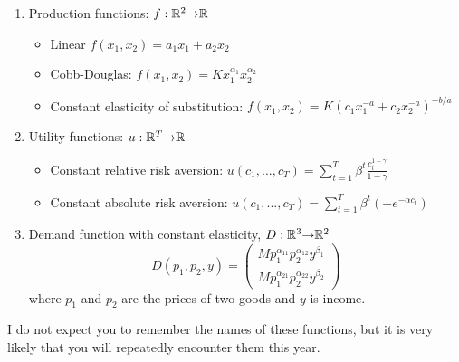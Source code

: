 \begin{example}$\;$
\begin{enumerate}
\item Production functions: $f:\mathbb{R}^2 {\rightarrow} \mathbb{R}$ 
  \begin{itemize}
  \item Linear $ f(x_1,x_2) = a_1 x_1 + a_2 x_2 $
  \item Cobb-Douglas: $f(x_1,x_2) = K x_1^{\alpha_1} x_2^{\alpha_2}$
  \item Constant elasticity of substitution: $f(x_1,x_2) = K (c_1
    x_1^{-a} + c_2 x_2^{-a})^{-b/a}$
  \end{itemize}
\item Utility functions: $u: \mathbb{R}^T {\rightarrow} \mathbb{R}$
  \begin{itemize}
  \item Constant relative risk aversion: $u(c_1,...,c_T) =
    \sum_{t=1}^T \beta^t \frac{c_t^{1-\gamma}}{1-\gamma}$
  \item Constant absolute risk aversion: $u(c_1,...,c_T) =
    \sum_{t=1}^T \beta^t (-e^{-\alpha c_t})$
  \end{itemize}
\item Demand function with constant elasticity,  $D:\mathbb{R}^3 {\rightarrow} \mathbb{R}^2$
  \[ D(p_1,p_2,y) = \begin{pmatrix} M p_1^{\alpha_{11}}
    p_2^{\alpha_{12}} y^{\beta_1} \\
    M p_1^{\alpha_{21}} p_2^{\alpha_{22}} y^{\beta_2}
  \end{pmatrix}
  \]  
  where $p_1$ and $p_2$ are the prices of two goods and $y$ is income.
\end{enumerate}
I do not expect you to remember the names of these functions, but it
is very likely that you will repeatedly encounter them this year. 
\end{example}

